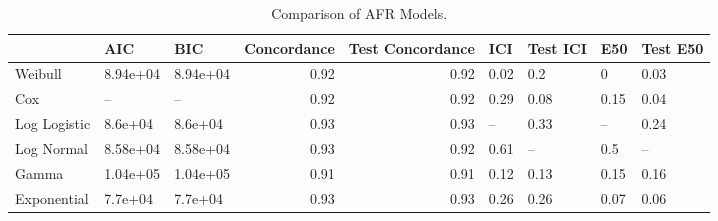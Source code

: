 \begin{table*}
\centering
\caption{Comparison of AFR Models.}
\label{tab:combined}
\begin{tabular}{lllrrllll}
\toprule
 & AIC & BIC & Concordance & Test Concordance & ICI & Test ICI & E50 & Test E50 \\
\midrule
Weibull & 8.94e+04 & 8.94e+04 & 0.92 & 0.92 & 0.02 & 0.2 & 0 & 0.03 \\
Cox & -- & -- & 0.92 & 0.92 & 0.29 & 0.08 & 0.15 & 0.04 \\
Log Logistic & 8.6e+04 & 8.6e+04 & 0.93 & 0.93 & -- & 0.33 & -- & 0.24 \\
Log Normal & 8.58e+04 & 8.58e+04 & 0.93 & 0.92 & 0.61 & -- & 0.5 & -- \\
Gamma & 1.04e+05 & 1.04e+05 & 0.91 & 0.91 & 0.12 & 0.13 & 0.15 & 0.16 \\
Exponential & 7.7e+04 & 7.7e+04 & 0.93 & 0.93 & 0.26 & 0.26 & 0.07 & 0.06 \\
\bottomrule
\end{tabular}
\end{table*}
